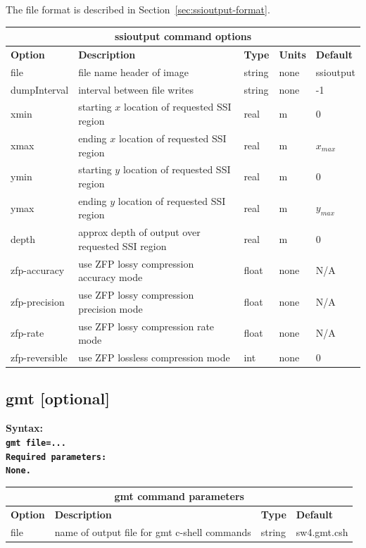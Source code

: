 \documentclass[11pt]{report}
\begin{document}
The file format is described in Section~\ref{sec:ssioutput-format}.
%
\begin{center}
\begin{tabular}{|l|p{8cm}|l|l|l|} \hline
\multicolumn{5}{|c|}{\bf ssioutput command options}\\ \hline
{\bf Option} & {\bf Description}          & {\bf Type} & {\bf Units} & {\bf Default} \\ \hline
\hline
file        & file name header of image                          & string & none
  & ssioutput \\ \hline
  dumpInterval & interval between file writes & string &  none & -1 \\ \hline
xmin     & starting $x$ location of requested SSI region & real & m & 0 \\ \hline
xmax     & ending $x$ location of requested SSI region & real & m & $x_{max}$ \\ \hline
ymin     & starting $y$ location of requested SSI region & real & m & 0 \\ \hline
ymax     & ending $y$ location of requested SSI region & real & m & $y_{max}$ \\ \hline
depth     & approx depth of output over requested SSI region & real & m & 0 \\ \hline
zfp-accuracy & use ZFP lossy compression accuracy mode & float & none & N/A \\ \hline
zfp-precision & use ZFP lossy compression precision mode & float &none &  N/A \\ \hline
zfp-rate & use ZFP lossy compression rate mode & float &none &  N/A \\ \hline
zfp-reversible & use ZFP lossless compression mode & int & none &  0 \\ \hline

\end{tabular}
\end{center}

\subsection{gmt [optional]}
\label{keyword:gmt}
\begin{flushleft}\bf
Syntax:\\
\tt gmt file=...\\
\bf Required parameters:\\
\rm None.
\end{flushleft}
%
\begin{center}
\begin{tabular}{|l|p{8cm}|l|l|} \hline
\multicolumn{4}{|c|}{\bf gmt command parameters}\\ \hline
\bf{Option} & \bf{Description} & \bf{Type} & \bf{Default} \\ \hline \hline
file & name of output file for gmt c-shell commands & string & sw4.gmt.csh  \\ \hline
\end{tabular}
\end{center}
\end{document}
